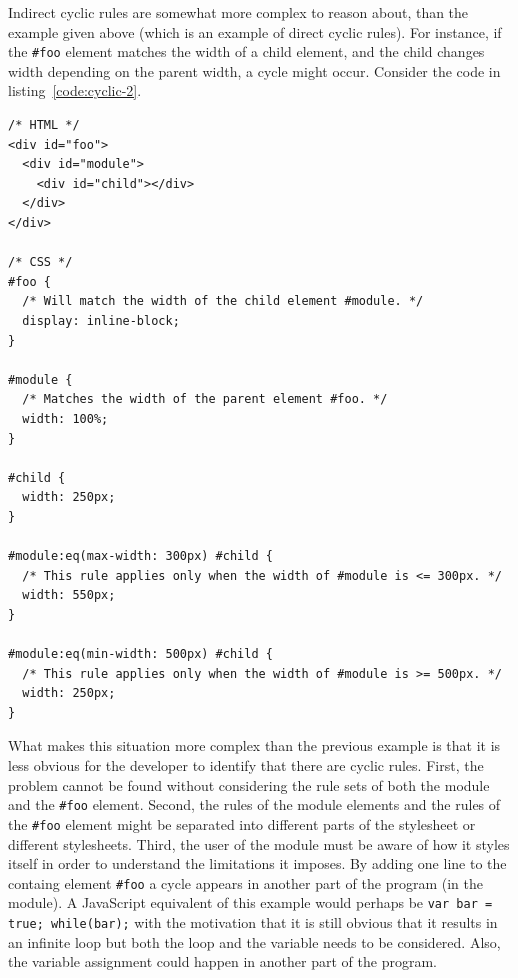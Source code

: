 \documentclass[a4paper,11pt]{kth-mag}
\newcommand{\code}[1]{\texttt{#1}}
\begin{document}
          Indirect cyclic rules are somewhat more complex to reason about, than the example given above (which is an example of direct cyclic rules).
          For instance, if the \code{\#foo} \gls{element} matches the width of a child \gls{element}, and the child changes width depending on the parent width, a cycle might occur.
          Consider the code in listing~\ref{code:cyclic-2}.
          
          \begin{lstlisting}[caption={Example of indirect cyclic rules. Here the user (\code{\#foo}) of the module (\code{\#module}) creates cyclic rules indirectly by specifying that it should match the width of the module.}, captionpos=b, label={code:cyclic-2}]
/* HTML */
<div id="foo">
  <div id="module">
    <div id="child"></div>
  </div>
</div>

/* CSS */
#foo {
  /* Will match the width of the child element #module. */
  display: inline-block;
}

#module {
  /* Matches the width of the parent element #foo. */
  width: 100%;
}

#child {
  width: 250px;
}

#module:eq(max-width: 300px) #child {
  /* This rule applies only when the width of #module is <= 300px. */
  width: 550px;
}

#module:eq(min-width: 500px) #child {
  /* This rule applies only when the width of #module is >= 500px. */
  width: 250px;
}
          \end{lstlisting}
          What makes this situation more complex than the previous example is that it is less obvious for the developer to identify that there are cyclic rules.
          First, the problem cannot be found without considering the rule sets of both the module and the \code{\#foo} element.
          Second, the rules of the module elements and the rules of the \code{\#foo} \gls{element} might be separated into different parts of the stylesheet or different stylesheets.
          Third, the user of the module must be aware of how it styles itself in order to understand the limitations it imposes.
          By adding one line to the containg element \code{\#foo} a cycle appears in another part of the program (in the module).
          A \gls{JavaScript} equivalent of this example would perhaps be \code{var bar = true; while(bar);} with the motivation that it is still obvious that it results in an infinite loop but both the loop and the variable needs to be considered.
          Also, the variable assignment could happen in another part of the program.
\end{document}
